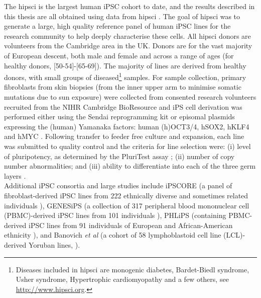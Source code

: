 The \gls{hipsci} is the largest human iPSC cohort to date, and the results described in this thesis are all obtained using data from \gls{hipsci} \cite{kilpinen2017common}.
The goal of \gls{hipsci} was to generate a large, high quality reference panel of human iPSC lines for the research community to help deeply characterise these cells. 
All \gls{hipsci} donors are volunteers from the Cambridge area in the UK. 
Donors are for the vast majority of European descent, both male and female and across a range of ages (for healthy donors, [50-54]-[65-69]).
The majority of lines are derived from healthy donors, with small groups of diseased\footnote{Diseases included in \gls{hipsci} are monogenic diabetes, Bardet-Biedl syndrome, Usher syndrome, Hypertrophic cardiomyopathy and a few others, see \url{http://www.hipsci.org}.} samples.
For sample collection, primary fibroblasts from skin biopsies (from the inner upper arm to minimise somatic mutations due to sun exposure) were collected from consented research volunteers recruited from the NIHR Cambridge BioResource and iPS cell derivation was performed either using the Sendai reprogramming kit or episomal plasmids expressing the (human) Yamanaka factors: human (h)OCT3/4, hSOX2, hKLF4 and hMYC \cite{yu2009human}.
Following transfer to feeder free culture and expansion, each line was submitted to quality control and the criteria for line selection were: (i) level of pluripotency, as determined by the PluriTest assay \cite{muller2011bioinformatic}; (ii) number of copy number abnormalities; and (iii) ability to differentiate into each of the three germ layers \cite{kilpinen2017common}. \\




Additional iPSC consortia and large studies include
iPSCORE (a panel of fibroblast-derived iPSC lines from 222 ethnically diverse and sometimes related individuals \cite{panopoulos2017ipscore}), GENESiPS (a collection of 317 peripheral blood mononuclear cell (PBMC)-derived iPSC lines from 101 individuals \cite{carcamo2017analysis}), PHLiPS (containing PBMC-derived iPSC lines from 91 individuals of European and African-American ethnicity \cite{pashos2017large}), and Banovich \textit{et al} (a cohort of 58 lymphoblastoid cell line (LCL)-derived Yoruban lines, \cite{banovich2018impact}).

